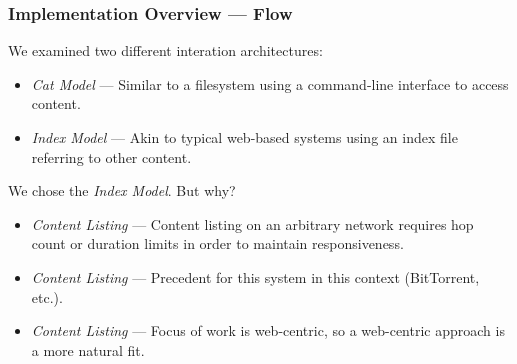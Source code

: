 \documentclass[t,handout, 10pt]{beamer}
\begin{document}
\begin{frame}
\frametitle{Implementation Overview --- Flow}
We examined two different interation architectures:
{\small
\begin{itemize}
\item {\it Cat Model} --- Similar to a filesystem using a command-line interface to access content.
\item {\it Index Model} --- Akin to typical web-based systems using an index file referring to other content.
\end{itemize}
}
\pause
We chose the {\it Index Model}.  But why?
{\small
\begin{itemize}
\item {\it Content Listing} --- Content listing on an arbitrary network requires hop count or duration limits in order to maintain responsiveness.
\item {\it Content Listing} --- Precedent for this system in this context (BitTorrent, etc.).
\item {\it Content Listing} --- Focus of work is web-centric, so a web-centric approach is a more natural fit.
\end{itemize}
}
\end{frame}
\end{document}
